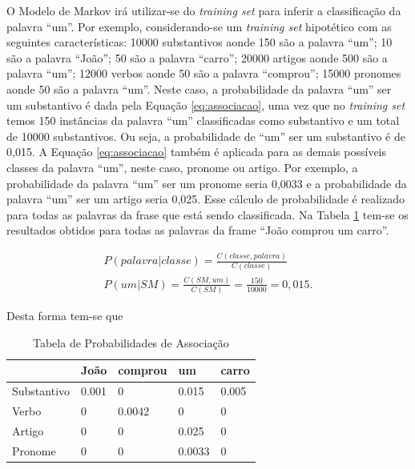 O Modelo de Markov irá utilizar-se do \textit{training set} para inferir a
classificação da palavra ``um''. Por exemplo, considerando-se um
\textit{training set} hipotético com as seguintes características: 10000
substantivos aonde 150 são a palavra ``um''; 10
são a palavra ``João''; 50 são a palavra ``carro''; 20000 artigos aonde 500 são
a palavra ``um''; 12000 verbos aonde 50 são a palavra ``comprou''; 15000
pronomes aonde 50 são a palavra ``um''. Neste caso, a probabilidade da palavra
``um'' ser um substantivo é dada pela Equação \ref{eq:associacao}, uma vez que
no \textit{training set} temos 150 instâncias da palavra ``um'' classificadas como
substantivo e um total de 10000 substantivos. Ou seja, a probabilidade de ``um'' ser um substantivo é
de 0,015. A Equação \ref{eq:associacao} também é aplicada para as demais
possíveis classes da palavra ``um'', neste caso, pronome ou artigo. Por exemplo, a
probabilidade da palavra ``um'' ser um pronome seria 0,0033 e a probabilidade da palavra ``um'' ser um artigo seria 0,025. Esse
cálculo de probabilidade é realizado para todas as palavras da frase que está
sendo classificada. Na Tabela \ref{tabela:associacao} tem-se os resultados
obtidos para todas as palavras da frame ``João comprou um carro''.

\begin{equation}
\begin{split}
P(palavra|classe) = \frac{C(classe,palavra)}{C(classe)}  \\
P(um|SM) = \frac{C(SM,um)}{C(SM)} = \frac{150}{10000} = 0,015.
\end{split}
\label{eq:associacao}
\end{equation}

Desta forma tem-se que 

\begin{table}[htb]
\centering
\begin{tabular}{|l|l|l|l|l|}
\hline
& João  & comprou & um     & carro  \\ \hline
Substantivo & 0.001 & 0       & 0.015  & 0.005  \\ \hline
Verbo       & 0     & 0.0042  & 0      & 0      \\ \hline
Artigo      & 0     & 0       & 0.025  & 0      \\ \hline
Pronome     & 0     & 0       & 0.0033 & 0      \\ \hline
\end{tabular}
\caption{Tabela de Probabilidades de Associação}
\label{tabela:associacao}
\end{table}

